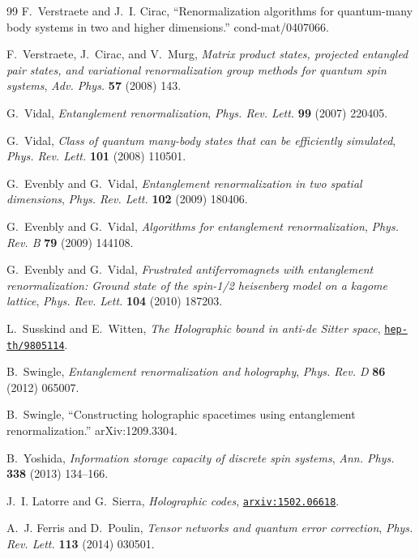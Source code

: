 \documentclass[12pt]{article}
\theoremstyle{plain}
\theoremstyle{plain}
\theoremstyle{plain}
\theoremstyle{plain}
\theoremstyle{result}
\theoremstyle{remark}
\theoremstyle{conjecture}
\theoremstyle{observation}
\theoremstyle{definition}
\theoremstyle{corollary}
\theoremstyle{definition}
\theoremstyle{definition}
\theoremstyle{assumption}
\theoremstyle{definition}
\theoremstyle{problem}
\theoremstyle{fact}
\begin{document}
\begin{thebibliography}{99}
F.~Verstraete and J.~I. Cirac, ``Renormalization algorithms for quantum-many
  body systems in two and higher dimensions.'' cond-mat/0407066.

F.~Verstraete, J.~Cirac, and V.~Murg, {\it Matrix product states, projected
  entangled pair states, and variational renormalization group methods for
  quantum spin systems},  {\em Adv. Phys.} {\bf 57} (2008) 143.

G.~Vidal, {\it Entanglement renormalization},  {\em Phys. Rev. Lett.} {\bf 99}
  (2007) 220405.

G.~Vidal, {\it Class of quantum many-body states that can be efficiently
  simulated},  {\em Phys. Rev. Lett.} {\bf 101} (2008) 110501.

G.~Evenbly and G.~Vidal, {\it Entanglement renormalization in two spatial
  dimensions},  {\em Phys. Rev. Lett.} {\bf 102} (2009) 180406.

G.~Evenbly and G.~Vidal, {\it Algorithms for entanglement renormalization},
  {\em Phys. Rev. B} {\bf 79} (2009) 144108.

G.~Evenbly and G.~Vidal, {\it Frustrated antiferromagnets with entanglement
  renormalization: Ground state of the spin-1/2 heisenberg model on a kagome
  lattice},  {\em Phys. Rev. Lett.} {\bf 104} (2010) 187203.

L.~Susskind and E.~Witten, {\it {The Holographic bound in anti-de Sitter
  space}},  \href{http://arxiv.org/abs/hep-th/9805114}{{\tt hep-th/9805114}}.

B.~Swingle, {\it Entanglement renormalization and holography},  {\em Phys. Rev.
  D} {\bf 86} (2012) 065007.

B.~Swingle, ``Constructing holographic spacetimes using entanglement
  renormalization.'' arXiv:1209.3304.

B.~Yoshida, {\it {Information storage capacity of discrete spin systems}},
  {\em Ann. Phys.} {\bf 338} (2013) 134--166.

J.~I. Latorre and G.~Sierra, {\it {Holographic codes}},
  \href{http://arxiv.org/abs/arxiv:1502.06618}{{\tt arxiv:1502.06618}}.

A.~J. Ferris and D.~Poulin, {\it Tensor networks and quantum error correction},
   {\em Phys. Rev. Lett.} {\bf 113} (2014) 030501.


\end{thebibliography}
\end{document}
